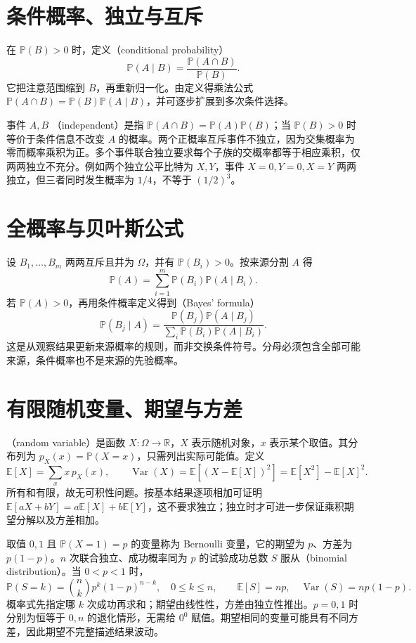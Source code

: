 \documentclass[UTF8]{ctexbook}
\begin{document}
\section{条件概率、独立与互斥}
在 $\mathbb P(B)>0$ 时，定义（conditional probability）
\[
 \mathbb P(A\mid B)=\frac{\mathbb P(A\cap B)}{\mathbb P(B)}.
\]
它把注意范围缩到 $B$，再重新归一化。由定义得乘法公式 $\mathbb P(A\cap B)=\mathbb P(B)\mathbb P(A\mid B)$，并可逐步扩展到多次条件选择。

事件 $A,B$ （independent）是指 $\mathbb P(A\cap B)=\mathbb P(A)\mathbb P(B)$；当 $\mathbb P(B)>0$ 时等价于条件信息不改变 $A$ 的概率。两个正概率互斥事件不独立，因为交集概率为零而概率乘积为正。多个事件联合独立要求每个子族的交概率都等于相应乘积，仅两两独立不充分。例如两个独立公平比特为 $X,Y$，事件 $X=0,Y=0,X=Y$ 两两独立，但三者同时发生概率为 $1/4$，不等于 $(1/2)^3$。

\section{全概率与贝叶斯公式}
设 $B_1,\ldots,B_m$ 两两互斥且并为 $\Omega$，并有 $\mathbb P(B_i)>0$。按来源分割 $A$ 得
\begin{equation}\label{eq:em-total-probability}
 \mathbb P(A)=\sum_{i=1}^m\mathbb P(B_i)\mathbb P(A\mid B_i).
\end{equation}
若 $\mathbb P(A)>0$，再用条件概率定义得到（Bayes' formula）
\[
 \mathbb P(B_j\mid A)=
 \frac{\mathbb P(B_j)\mathbb P(A\mid B_j)}
 {\sum_i\mathbb P(B_i)\mathbb P(A\mid B_i)}.
\]
这是从观察结果更新来源概率的规则，而非交换条件符号。分母必须包含全部可能来源，条件概率也不是来源的先验概率。

\section{有限随机变量、期望与方差}
（random variable）是函数 $X:\Omega\to\mathbb R$，$X$ 表示随机对象，$x$ 表示某个取值。其分布列为 $p_X(x)=\mathbb P(X=x)$，只需列出实际可能值。定义
\[
 \mathbb E[X]=\sum_x x\,p_X(x),\qquad
 \operatorname{Var}(X)=\mathbb E[(X-\mathbb E[X])^2]
 =\mathbb E[X^2]-\mathbb E[X]^2.
\]
所有和有限，故无可积性问题。按基本结果逐项相加可证明 $\mathbb E[aX+bY]=a\mathbb E[X]+b\mathbb E[Y]$，这不要求独立；独立时才可进一步保证乘积期望分解以及方差相加。

取值 $0,1$ 且 $\mathbb P(X=1)=p$ 的变量称为 Bernoulli 变量，它的期望为 $p$、方差为 $p(1-p)$。$n$ 次联合独立、成功概率同为 $p$ 的试验成功总数 $S$ 服从（binomial distribution）。当 $0<p<1$ 时，
\[
 \mathbb P(S=k)=\binom nk p^k(1-p)^{n-k},\quad 0\le k\le n,
 \qquad \mathbb E[S]=np,\quad\operatorname{Var}(S)=np(1-p).
\]
概率式先指定哪 $k$ 次成功再求和；期望由线性性，方差由独立性推出。$p=0,1$ 时分别为恒等于 $0,n$ 的退化情形，无需给 $0^0$ 赋值。期望相同的变量可能具有不同方差，因此期望不完整描述结果波动。
\end{document}
